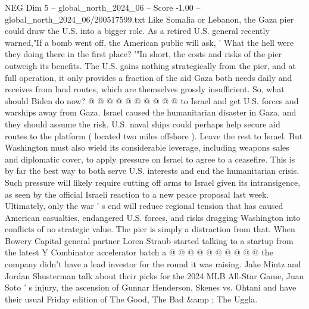 \begin{textsample}{NEG Dim 5 – global\_north\_2024\_06 – Score -1.00 – global\_north\_2024\_06/200517599.txt}
Like Somalia or Lebanon, the Gaza pier could draw the U.S. into a bigger role.
As a retired U.S. general recently warned,"If a bomb went off, the American public will ask, ' What the hell were they doing there in the first place? '"In short, the costs and risks of the pier outweigh its benefits.
The U.S. gains nothing strategically from the pier, and at full operation, it only provides a fraction of the aid Gaza both needs daily and receives from land routes, which are themselves grossly insufficient.
So, what should Biden do now? @ @ @ @ @ @ @ @ @ @ to Israel and get U.S. forces and warships away from Gaza.
Israel caused the humanitarian disaster in Gaza, and they should assume the risk.
U.S. naval ships could perhaps help secure aid routes to the platform ( located two miles offshore ).
Leave the rest to Israel.
But Washington must also wield its considerable leverage, including weapons sales and diplomatic cover, to apply pressure on Israel to agree to a ceasefire.
This is by far the best way to both serve U.S. interests and end the humanitarian crisis.
Such pressure will likely require cutting off arms to Israel given its intransigence, as seen by the official Israeli reaction to a new peace proposal last week.
Ultimately, only the war ' s end will reduce regional tension that has caused American casualties, endangered U.S. forces, and risks dragging Washington into conflicts of no strategic value.
The pier is simply a distraction from that.
When Bowery Capital general partner Loren Straub started talking to a startup from the latest Y Combinator accelerator batch a @ @ @ @ @ @ @ @ @ @ the company didn't have a lead investor for the round it was raising.
Jake Mintz and Jordan Shusterman talk about their picks for the 2024 MLB All-Star Game, Juan Soto ' s injury, the ascension of Gunnar Henderson, Skenes vs.
Ohtani and have their usual Friday edition of The Good, The Bad \&amp ; The Uggla.

\end{textsample}
